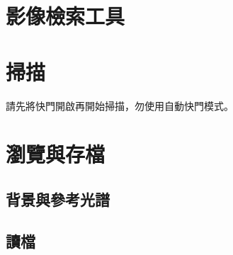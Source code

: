 \documentclass[12pt]{article}
\begin{document}
    \section{影像檢索工具}
    \section{掃描}
    請先將快門開啟再開始掃描，勿使用自動快門模式。
    \section{瀏覽與存檔}
    \subsection{背景與參考光譜}\label{sec: bkg/ref}
    \subsection{讀檔}
\end{document}
